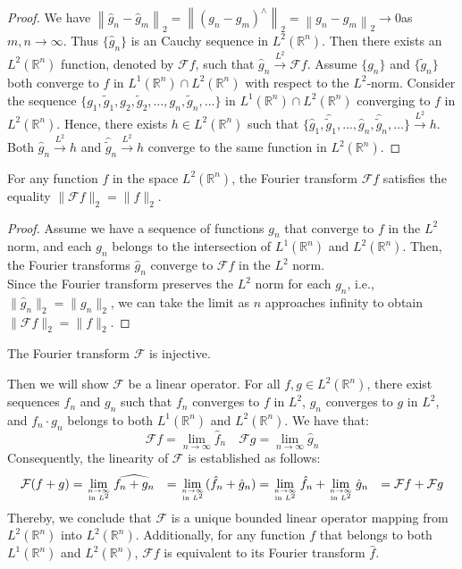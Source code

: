 \begin{proof}
We have
$\left\|\hat{g}_n-\hat{g}_m\right\|_2 = \left\|(g_n-g_m)^\wedge\right\|_2 = \left\|g_n-g_m\right\|_2 \rightarrow 0$as $m, n \rightarrow \infty$.
Thus $\{\hat{g}_n\}$ is an Cauchy sequence in $L^2(\mathbb{R}^n)$. Then there exists an $L^2(\mathbb{R}^n)$ function, denoted by $\mathcal{F}f$, such that $\hat{g}_n \xrightarrow{L^2} \mathcal{F}f$.
Assume $\{g_n\}$ and $\{\widetilde{g}_n\}$ both converge to $f$ in $L^1(\mathbb{R}^n) \cap L^2(\mathbb{R}^n)$ with respect to the $L^2$-norm.
Consider the sequence $\{g_1, \tilde{g}_1, g_2, \tilde{g}_2, \ldots, g_n, \tilde{g}_n, \ldots\}$ in $L^1(\mathbb{R}^n) \cap L^2(\mathbb{R}^n)$ converging to $f$ in $L^2(\mathbb{R}^n)$.
Hence, there exists $h \in L^2(\mathbb{R}^n)$ such that $\{\hat{g}_1, \hat{\tilde{g}}_1, \ldots, \hat{g}_n, \widehat{\tilde{g}}_n, \ldots\} \xrightarrow{L^2} h$.
Both $\hat{g}_n \xrightarrow{L^2} h$ and $\widehat{\tilde{g}}_n \xrightarrow{L^2} h$ converge to the same function in $L^2(\mathbb{R}^n)$. 
\end{proof}
\begin{theorem}
   For any function $f$ in the space $L^2(\mathbb{R}^n)$, the Fourier transform $\mathcal{F}f$ satisfies the equality $\|\mathcal{F}f\|_2 = \|f\|_2$.
\end{theorem}
\begin{proof}
Assume we have a sequence of functions $g_n$ that converge to $f$ in the $L^2$ norm, and each $g_n$ belongs to the intersection of $L^1(\mathbb{R}^n)$ and $L^2(\mathbb{R}^n)$. Then, the Fourier transforms $\hat{g}_n$ converge to $\mathcal{F}f$ in the $L^2$ norm.\\
Since the Fourier transform preserves the $L^2$ norm for each $g_n$, i.e., $\|\hat{g}_n\|_2 = \|g_n\|_2$, we can take the limit as $n$ approaches infinity to obtain $\|\mathcal{F}f\|_2 = \|f\|_2$.
\end{proof}
\begin{corollary}
    The Fourier transform $\mathcal{F}$ is injective.
\end{corollary}
Then we will show $\mathcal{F}$ be a linear operator. For all $f, g \in L^2(\mathbb{R}^n)$, there exist sequences ${f_n}$ and ${g_n}$ such that $f_n$ converges to $f$ in $L^2$, $g_n$ converges to $g$ in $L^2$, and $f_n \cdot g_n$ belongs to both $L^1(\mathbb{R}^n)$ and $L^2(\mathbb{R}^n)$. We have that:
$$\mathcal{F}f = \lim_{{n \to \infty} } \hat{f}_n \quad \mathcal{F}g = \lim_{{n \to \infty} } \hat{g}_n$$
Consequently, the linearity of $\mathcal{F}$ is established as follows:
$$\begin{aligned}
    \mathcal{F}(f+g) &= \lim_{{n \to \infty} \atop {\text{in } L^2}} \widehat{f_n + g_n}
&= \lim_{{n \to \infty} \atop {\text{in } L^2}} (\hat{f}_n + \hat{g}_n)
&= \lim_{{n \to \infty} \atop {\text{in } L^2}} \hat{f}_n + \lim_{{n \to \infty} \atop {\text{in } L^2}} \hat{g}_n
&= \mathcal{F}f + \mathcal{F}g
\end{aligned}$$
Thereby, we conclude that $\mathcal{F}$ is a unique bounded linear operator mapping from $L^2(\mathbb{R}^n)$ into $L^2(\mathbb{R}^n)$. Additionally, for any function $f$ that belongs to both $L^1(\mathbb{R}^n)$ and $L^2(\mathbb{R}^n)$, $\mathcal{F}f$ is equivalent to its Fourier transform $\hat{f}$.

